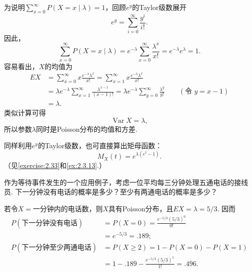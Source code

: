 为说明$\sum_{x=0}^\infty P(X=x\mid\lambda)=1$，回顾$e^y$的Taylor级数展开
$$e^y=\sum_{i=0}^\infty\frac{y^i}{i!}.$$
因此，
$$\sum_{x=0}^\infty P(X=x\mid\lambda)=e^{-\lambda}\sum_{x=0}^\infty\frac{\lambda^x}{x!}=e^{-\lambda}e^\lambda=1.$$
容易看出，$X$的均值为
\begin{align*}
EX&=\sum_{x=0}^\infty x\frac{e^{-\lambda}\lambda^x}{x!}
=\sum_{x=1}^\infty x\frac{e^{-\lambda}\lambda^x}{x!}\\
&=\lambda e^{-\lambda}\sum_{x=1}^\infty\frac{\lambda^{x-1}}{(x-1)!}
=\lambda e^{-\lambda}\sum_{y=0}^\infty\frac{\lambda^y}{y!}\qquad(\text{令 }y=x-1)\\
&=\lambda.
\end{align*}
类似计算可得
$$\operatorname{Var}X=\lambda,$$
所以参数$\lambda$同时是Poisson分布的均值和方差.

同样利用$e^y$的Taylor级数，也可直接算出矩母函数：
$$M_X(t)=e^{\lambda(e^t-1)}.$$
（见\autoref{exercise:2.33}和\autoref{ex:2.3.13}.）

\begin{example}[等待时间]\label{ex:3.2.4}
作为等待事件发生的一个应用例子，考虑一位平均每三分钟处理五通电话的接线员. 下一分钟没有电话的概率是多少？至少有两通电话的概率是多少？

若令$X=$一分钟内的电话数，则$X$具有Poisson分布，且$EX=\lambda=5/3$. 因而
\begin{align*}
P(\text{下一分钟没有电话})&=P(X=0)
=\frac{e^{-5/3}(5/3)^0}{0!}\\
&=e^{-5/3}=.189;\\
P(\text{下一分钟至少两通电话})&=P(X\ge2)
=1-P(X=0)-P(X=1)\\
&=1-.189-\frac{e^{-5/3}(5/3)^1}{1!}=.496.
\end{align*}
\end{example}

